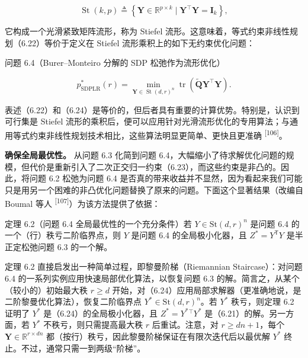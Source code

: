 \begin{equation}
\operatorname{St} (k, p) \triangleq \left\{\boldsymbol {Y} \in \mathbb {R} ^ {p \times k} \mid \boldsymbol {Y} ^ {\top} \boldsymbol {Y} = \mathbf {I} _ {k} \right\},\tag{6.23}
\end{equation}

它构成一个光滑紧致矩阵流形，称为 Stiefel 流形。这意味着，等式约束非线性规划（6.22）等价于定义在 Stiefel 流形乘积上的如下无约束优化问题：

问题 6.4（Burer--Monteiro 分解的 SDP 松弛作为流形优化）

\begin{equation}
p _ {\mathrm{SDPLR}} ^ {*} (r) = \min _ {\boldsymbol {Y} \in \operatorname{St} (d, r) ^ {n}} \operatorname{tr} \left(\tilde {\boldsymbol {Q}} \boldsymbol {Y} ^ {\top} \boldsymbol {Y}\right).\tag{6.24}
\end{equation}

表述（6.22）和（6.24）是等价的，但后者具有重要的计算优势。特别是，认识到可行集是 Stiefel 流形的乘积后，便可以应用针对光滑流形优化的专用算法；与通用等式约束非线性规划技术相比，这些算法明显更简单、更快且更准确 \textsuperscript{[106]}。

\textbf{确保全局最优性。} 从问题 6.3 化简到问题 6.4，大幅缩小了待求解优化问题的规模，但代价是重新引入了二次正交归一约束（6.23），而这些约束是非凸的。因此，将问题 6.2 松弛为问题 6.4 是否真的带来收益并不显然，因为看起来我们可能只是用另一个困难的非凸优化问题替换了原来的问题。下面这个显著结果（改编自 Boumal 等人 \textsuperscript{[107]}）为该方法提供了依据：

定理 6.2（问题 6.4 全局最优性的一个充分条件）若 $Y \in { \mathrm { S t } } ( d , r ) ^ { n }$ 是问题 6.4 的一个（行）秩亏二阶临界点，则 $Y$ 是问题 6.4 的全局极小化器，且 $Z ^ { * } = Y ^ { \mathsf { T } } Y$ 是半正定松弛问题 6.3 的一个解。

定理 6.2 直接启发出一种简单过程，即黎曼阶梯（Riemannian Staircase）：对问题 6.4 的一系列实例应用快速局部优化算法，以恢复问题 6.3 的解。简言之，从某个（较小的）初始最大秩 $r \geq d$ 开始，对（6.24）应用局部求解器（更准确地说，是二阶黎曼优化算法），恢复二阶临界点 $Y ^ { * } \in { \mathrm { S t } } ( d , r ) ^ { n }$。若 $Y ^ { * }$ 秩亏，则定理 6.2 证明了 $Y ^ { * }$ 是（6.24）的全局极小化器，且 $Z ^ { * } = Y ^ { * } { } ^ { \top } Y ^ { * }$ 是（6.21）的解。另一方面，若 $Y ^ { * }$ 不秩亏，则只需提高最大秩 $r$ 后重试。注意，对 $r \geq d n + 1$，每个 $\pmb { Y } \in \mathbb { R } ^ { r \times d n }$ 都（按行）秩亏，因此黎曼阶梯保证在有限次迭代后以最优解 $Y ^ { * }$ 终止。不过，通常只需一到两级“阶梯”。

